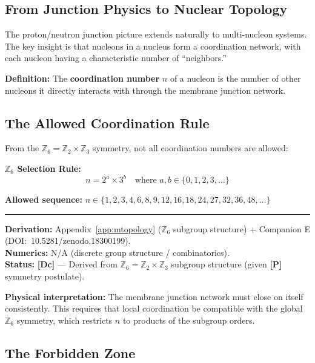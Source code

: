 \documentclass[11pt,a4paper]{article}
\newcommand{\tagP}{\textcolor{red!70!black}{\textbf{[P]}}}
\newcommand{\tagDc}{\textcolor{blue!70!black}{\textbf{[Dc]}}}
\begin{document}
\subsection{From Junction Physics to Nuclear Topology}

The proton/neutron junction picture extends naturally to multi-nucleon systems. The key insight is that nucleons in a nucleus form a coordination network, with each nucleon having a characteristic number of ``neighbors.''

\textbf{Definition:} The \textbf{coordination number} $n$ of a nucleon is the number of other nucleons it directly interacts with through the membrane junction network.

\subsection{The Allowed Coordination Rule}

From the $\mathbb{Z}_6 = \mathbb{Z}_2 \times \mathbb{Z}_3$ symmetry, not all coordination numbers are allowed:

\begin{resultbox}
\textbf{$\mathbb{Z}_6$ Selection Rule:}
\begin{equation}
    n = 2^a \times 3^b \quad \text{where } a, b \in \{0, 1, 2, 3, \ldots\}
    \label{eq:allowed_n}
\end{equation}

\textbf{Allowed sequence:} $n \in \{1, 2, 3, 4, 6, 8, 9, 12, 16, 18, 24, 27, 32, 36, 48, \ldots\}$

\vspace{0.3em}\hrule\vspace{0.3em}
\textbf{Derivation:} Appendix~\ref{app:mtopology} ($\mathbb{Z}_6$ subgroup structure) + Companion E (DOI:~10.5281/zenodo.18300199).\\
\textbf{Numerics:} N/A (discrete group structure / combinatorics).\\
\textbf{Status:} \tagDc{} --- Derived from $\mathbb{Z}_6 = \mathbb{Z}_2 \times \mathbb{Z}_3$ subgroup structure (given \tagP{} symmetry postulate).
\end{resultbox}

\textbf{Physical interpretation:} The membrane junction network must close on itself consistently. This requires that local coordination be compatible with the global $\mathbb{Z}_6$ symmetry, which restricts $n$ to products of the subgroup orders.

\subsection{The Forbidden Zone}
\end{document}
